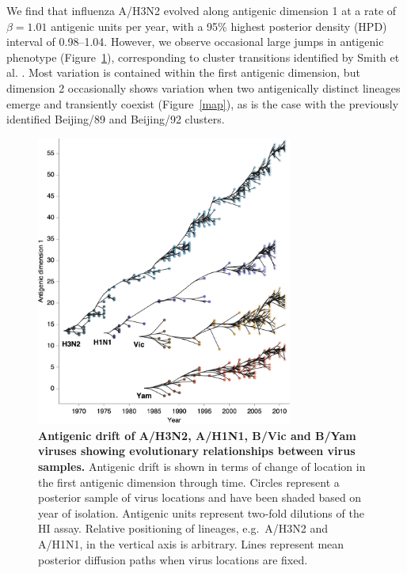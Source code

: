 \documentclass[11pt,oneside,letterpaper]{article}
\begin{document}
We find that influenza A/H3N2 evolved along antigenic dimension 1 at a rate of $\beta=1.01$ antigenic units per year, with a 95\% highest posterior density (HPD) interval of 0.98--1.04.
However, we observe occasional large jumps in antigenic phenotype (Figure~\ref{drift}), corresponding to cluster transitions identified by Smith et al. \cite{Smith04}.  
Most variation is contained within the first antigenic dimension, but dimension 2 occasionally shows variation when two antigenically distinct lineages emerge and transiently coexist (Figure~\ref{map}), as is the case with the previously identified Beijing/89 and Beijing/92 clusters.

\begin{figure}[h]
	\centering		
	\includegraphics[width=0.75\textwidth]{figures/drift}
	\caption{\textbf{Antigenic drift of A/H3N2, A/H1N1, B/Vic and B/Yam viruses showing evolutionary relationships between virus samples.} 
	Antigenic drift is shown in terms of change of location in the first antigenic dimension through time.
	Circles represent a posterior sample of virus locations and have been shaded based on year of isolation.
	Antigenic units represent two-fold dilutions of the HI assay.
	Relative positioning of lineages, e.g.\ A/H3N2 and A/H1N1, in the vertical axis is arbitrary.
	Lines represent mean posterior diffusion paths when virus locations are fixed.} 
	\label{drift} 
\end{figure}
\end{document}
